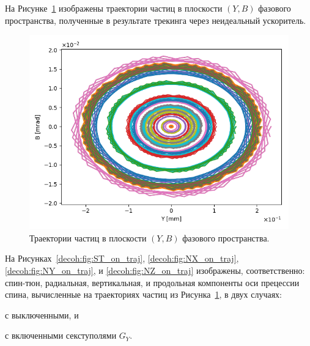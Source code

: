 На Рисунке~\ref{decoh:fig:yb_traj} изображены траектории частиц в плоскости $(Y,B)$ фазового пространства, полученные в результате трекинга через неидеальный ускоритель.
\begin{figure}[h!]
	\centering
	\includegraphics[height=.35\paperheight]{images/decoh_sim/YB-PHASE_SPACE_IMPERFECT_UNOPT}
	\caption{Траектории частиц в плоскости $(Y,B)$ фазового пространства.\label{decoh:fig:yb_traj}} 
\end{figure}

На Рисунках~\ref{decoh:fig:ST_on_traj}, \ref{decoh:fig:NX_on_traj}, \ref{decoh:fig:NY_on_traj}, и \ref{decoh:fig:NZ_on_traj} изображены, соответственно: спин-тюн, радиальная, вертикальная, и продольная компоненты оси прецессии спина, вычисленные на траекториях частиц из Рисунка~\ref{decoh:fig:yb_traj}, в двух случаях:
\begin{enumerate*}
	\item с выключенными, и 
	\item с включенными секступолями $G_Y$.
\end{enumerate*}  

